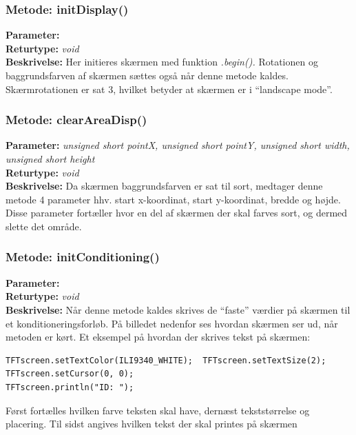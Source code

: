 \subsubsection{Metode: initDisplay()}
\textbf{Parameter: } 
\\ \textbf{Returtype: } \textit{void}
\\ \textbf{Beskrivelse: } Her initieres skærmen med funktion \textit{.begin().} Rotationen og baggrundsfarven af skærmen sættes også når denne metode kaldes. Skærmrotationen er sat 3, hvilket betyder at skærmen er i “landscape mode”. 

\subsubsection{Metode: clearAreaDisp()}
\textbf{Parameter: } \textit{unsigned short pointX, unsigned short pointY, unsigned short width, unsigned short height}
\\ \textbf{Returtype: } \textit{void}
\\ \textbf{Beskrivelse: } Da skærmen baggrundsfarven er sat til sort, medtager denne metode 4 parameter hhv. start x-koordinat, start y-koordinat, bredde og højde. Disse parameter fortæller hvor en del af skærmen der skal farves sort, og dermed slette det område.

\subsubsection{Metode: initConditioning()}
\textbf{Parameter: }
\\ \textbf{Returtype: } \textit{void}
\\ \textbf{Beskrivelse: } Når denne metode kaldes skrives de “faste” værdier på skærmen til et konditioneringsforløb. På billedet nedenfor ses hvordan skærmen ser ud, når metoden er kørt. Et eksempel på hvordan der skrives tekst på skærmen: 
\begin{lstlisting}
TFTscreen.setTextColor(ILI9340_WHITE);  TFTscreen.setTextSize(2);
TFTscreen.setCursor(0, 0);
TFTscreen.println("ID: ");
\end{lstlisting}
Først fortælles hvilken farve teksten skal have, dernæst tekststørrelse og placering. Til sidst angives hvilken tekst der skal printes på skærmen


